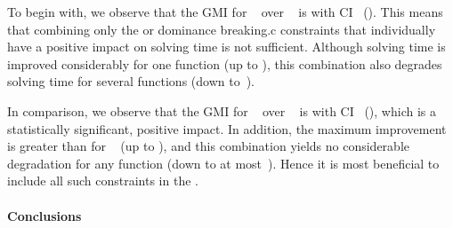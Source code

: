 To begin with, we observe that the \gls{GMI} for ~ over ~ is \printGMI{%
  \SolvTechEnableOnlyGoodDomConsPrePlusSolvingTimeSpeedupPrePlusSolvingTimeRegularSpeedupGmean%
} with \gls{CI}~\printGMICI{%
  \SolvTechEnableOnlyGoodDomConsPrePlusSolvingTimeSpeedupPrePlusSolvingTimeRegularSpeedupCiMin%
}{%
  \SolvTechEnableOnlyGoodDomConsPrePlusSolvingTimeSpeedupPrePlusSolvingTimeRegularSpeedupCiMax%
} ().
%
This means that combining only the  or
\gls{dominance breaking.c} \glspl{constraint} that individually have a positive
impact on solving time is not sufficient.
%
Although solving time is improved considerably for one \gls{function} (up to
\printZCNorm{%
  \SolvTechEnableOnlyGoodDomConsPrePlusSolvingTimeSpeedupPrePlusSolvingTimeZeroCenteredSpeedupMax%
}), this combination also degrades solving time for several \glspl{function}
(down
to~\printZCNorm{%
  \SolvTechEnableOnlyGoodDomConsPrePlusSolvingTimeSpeedupPrePlusSolvingTimeZeroCenteredSpeedupMin%
}).

In comparison, we observe that the \gls{GMI} for ~ over ~ is \printGMI{%
  \SolvTechDisableAllDomConsPrePlusSolvingTimeSpeedupPrePlusSolvingTimeRegularSpeedupGmean%
} with \gls{CI}~\printGMICI{%
  \SolvTechDisableAllDomConsPrePlusSolvingTimeSpeedupPrePlusSolvingTimeRegularSpeedupCiMin%
}{%
  \SolvTechDisableAllDomConsPrePlusSolvingTimeSpeedupPrePlusSolvingTimeRegularSpeedupCiMax%
} (), which is a statistically
significant, positive impact.
%
In addition, the maximum improvement is greater than for ~ (up to
\printZCNorm{%
  \SolvTechDisableAllDomConsPrePlusSolvingTimeSpeedupPrePlusSolvingTimeZeroCenteredSpeedupMax%
}), and this combination yields no considerable degradation for any
\gls{function} (down to at
most~\printZCNorm{%
  \SolvTechDisableAllDomConsPrePlusSolvingTimeSpeedupPrePlusSolvingTimeZeroCenteredSpeedupMin%
}).
%
Hence it is most beneficial to include all such \glspl{constraint} in the
.


\paragraph{Conclusions}

